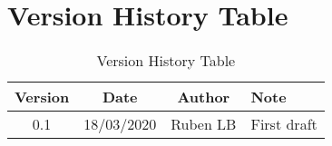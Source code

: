 \section{Version History Table}

\begin{table}[h]
	\centering
	\begin{tabular}{|c|c|c|l|}
		\hline
		Version & Date       & Author     & Note                                \\ \hline
		0.1     & 18/03/2020 & Ruben LB   & First draft                         \\ \hline
	\end{tabular}
	\caption{Version History Table}
	\label{tab:version-table}
\end{table}
